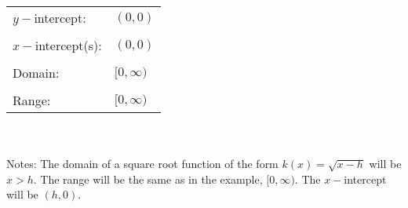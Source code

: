 \documentclass[11pt]{book}
\theoremstyle{definition}  %
\begin{document}
\vspace{0.5in}
\begin{tabular}{ll}
$y-$intercept: & $(0,0)$\\
&\\
$x-$intercept(s): & $(0,0)$\\
&\\
Domain: & $[0,\infty)$\\
&\\
Range: & $[0,\infty)$
\end{tabular}
\\
~\\

\noindent Notes: The domain of a square root function of the form $k(x)=\sqrt{x-h}$ will be $x>h$.  The range will be the same as in the example, $[0,\infty)$.  The $x-$intercept will be $(h,0)$. 

\newpage
\end{document}

